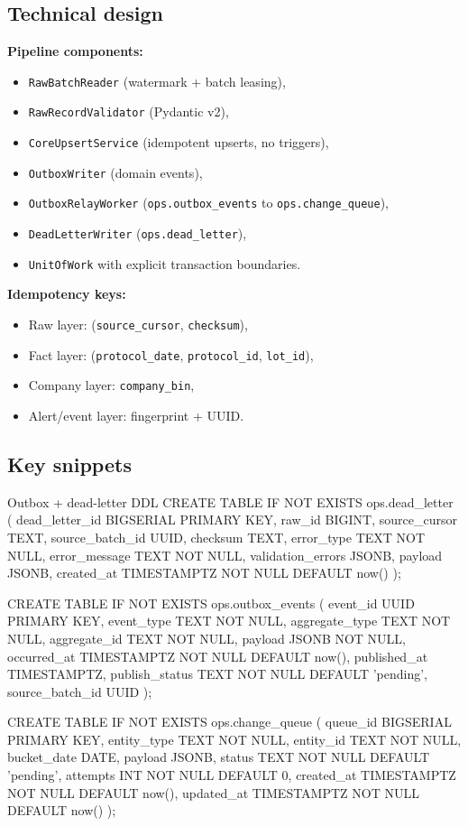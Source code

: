 \documentclass[11pt,a4paper]{article}
\begin{document}
\subsection{Technical design}
\textbf{Pipeline components:}
\begin{itemize}[leftmargin=1.4em]
  \item \texttt{RawBatchReader} (watermark + batch leasing),
  \item \texttt{RawRecordValidator} (Pydantic v2),
  \item \texttt{CoreUpsertService} (idempotent upserts, no triggers),
  \item \texttt{OutboxWriter} (domain events),
  \item \texttt{OutboxRelayWorker} (\texttt{ops.outbox\_events} to \texttt{ops.change\_queue}),
  \item \texttt{DeadLetterWriter} (\texttt{ops.dead\_letter}),
  \item \texttt{UnitOfWork} with explicit transaction boundaries.
\end{itemize}

\textbf{Idempotency keys:}
\begin{itemize}[leftmargin=1.4em]
  \item Raw layer: (\texttt{source\_cursor}, \texttt{checksum}),
  \item Fact layer: (\texttt{protocol\_date}, \texttt{protocol\_id}, \texttt{lot\_id}),
  \item Company layer: \texttt{company\_bin},
  \item Alert/event layer: fingerprint + UUID.
\end{itemize}

\subsection{Key snippets}
\begin{codeblock}[language=SQL]{Outbox + dead-letter DDL}
CREATE TABLE IF NOT EXISTS ops.dead_letter (
    dead_letter_id BIGSERIAL PRIMARY KEY,
    raw_id BIGINT,
    source_cursor TEXT,
    source_batch_id UUID,
    checksum TEXT,
    error_type TEXT NOT NULL,
    error_message TEXT NOT NULL,
    validation_errors JSONB,
    payload JSONB,
    created_at TIMESTAMPTZ NOT NULL DEFAULT now()
);

CREATE TABLE IF NOT EXISTS ops.outbox_events (
    event_id UUID PRIMARY KEY,
    event_type TEXT NOT NULL,
    aggregate_type TEXT NOT NULL,
    aggregate_id TEXT NOT NULL,
    payload JSONB NOT NULL,
    occurred_at TIMESTAMPTZ NOT NULL DEFAULT now(),
    published_at TIMESTAMPTZ,
    publish_status TEXT NOT NULL DEFAULT 'pending',
    source_batch_id UUID
);

CREATE TABLE IF NOT EXISTS ops.change_queue (
    queue_id BIGSERIAL PRIMARY KEY,
    entity_type TEXT NOT NULL,
    entity_id TEXT NOT NULL,
    bucket_date DATE,
    payload JSONB,
    status TEXT NOT NULL DEFAULT 'pending',
    attempts INT NOT NULL DEFAULT 0,
    created_at TIMESTAMPTZ NOT NULL DEFAULT now(),
    updated_at TIMESTAMPTZ NOT NULL DEFAULT now()
);
\end{codeblock}
\end{document}
